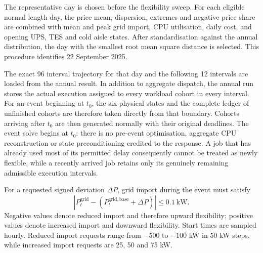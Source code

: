 The representative day is chosen before the flexibility sweep. For each eligible
normal length day, the price mean, dispersion, extremes and negative price share
are combined with mean and peak grid import, CPU utilisation, daily cost, and
opening UPS, TES and cold aisle states. After standardisation against the annual
distribution, the day with the smallest root mean square distance is selected.
This procedure identifies 22 September 2025.

The exact 96 interval trajectory for that day and the following 12 intervals are
loaded from the annual result. In addition to aggregate dispatch, the annual run
stores the actual execution assigned to every workload cohort in every interval.
For an event beginning at $t_0$, the six physical states and the complete ledger
of unfinished cohorts are therefore taken directly from that boundary. Cohorts
arriving after $t_0$ are then generated normally with their original deadlines.
The event solve begins at $t_0$: there is no pre-event optimisation, aggregate
CPU reconstruction or state preconditioning credited to the response. A job
that has already used most of its permitted delay consequently cannot be treated
as newly flexible, while a recently arrived job retains only its genuinely
remaining admissible execution intervals.

For a requested signed deviation $\Delta P$, grid import during the event must
satisfy
\begin{equation}
 \left|P_t^{\mathrm{grid}}-
 (P_t^{\mathrm{grid,base}}+\Delta P)\right|\leq0.1\ \mathrm{kW}.
 \label{eq:flex-target}
\end{equation}
Negative values denote reduced import and therefore upward flexibility; positive
values denote increased import and downward flexibility. Start times are sampled
hourly. Reduced import requests range from $-500$ to $-100$ kW in 50 kW steps,
while increased import requests are 25, 50 and 75 kW.

